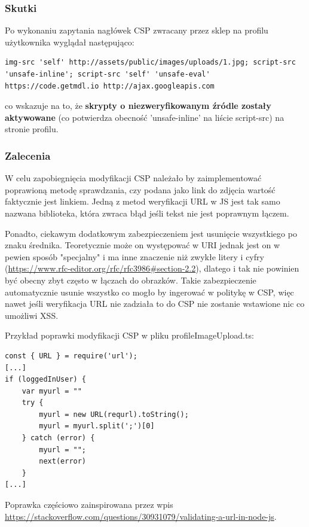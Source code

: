 \subsubsection{Skutki}

Po wykonaniu zapytania nagłówek CSP zwracany przez sklep na profilu użytkownika wyglądał następująco:
\begin{lstlisting}
img-src 'self' http://assets/public/images/uploads/1.jpg; script-src 'unsafe-inline'; script-src 'self' 'unsafe-eval' https://code.getmdl.io http://ajax.googleapis.com
\end{lstlisting}
co wskazuje na to, że \textbf{skrypty o niezweryfikowanym źródle zostały aktywowane} (co potwierdza obecność 'unsafe-inline' na liście script-src) na stronie profilu. 

\subsubsection{Zalecenia}
W celu zapobiegnięcia modyfikacji CSP należało by zaimplementować poprawioną metodę sprawdzania, czy podana jako link do zdjęcia wartość faktycznie jest linkiem.
Jedną z metod weryfikacji URL w JS jest tak samo nazwana biblioteka, która zwraca błąd jeśli tekst nie jest poprawnym łączem. 

Ponadto, ciekawym dodatkowym zabezpieczeniem jest usunięcie wszystkiego po znaku średnika. Teoretycznie może on występować w URI jednak jest on w pewien sposób "specjalny" i ma inne znaczenie niż zwykłe litery i cyfry (\href{https://www.rfc-editor.org/rfc/rfc3986\#section-2.2}{https://www.rfc-editor.org/rfc/rfc3986\#section-2.2}), dlatego i tak nie powinien być obecny zbyt często w łączach do obrazków. Takie zabezpieczenie automatycznie usunie wszystko co mogło by ingerować w politykę w CSP, więc nawet jeśli weryfikacja URL nie zadziała to do CSP nie zostanie wstawione nic co umożliwi XSS.

Przykład poprawki modyfikacji CSP w pliku profileImageUpload.ts:
\begin{lstlisting}
const { URL } = require('url');
[...]
if (loggedInUser) {
    var myurl = ""
    try {
        myurl = new URL(requrl).toString();
        myurl = myurl.split(';')[0] 
    } catch (error) {
        myurl = "";
        next(error)
    }
[...]
\end{lstlisting}
Poprawka częściowo zainspirowana przez wpis \href{https://stackoverflow.com/questions/30931079/validating-a-url-in-node-js}{https://stackoverflow.com/questions/30931079/validating-a-url-in-node-js}.


